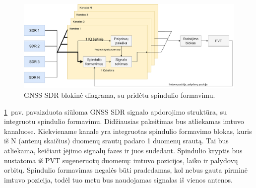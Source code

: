 \documentclass[main.tex]{subfiles}
\begin{document}
\begin{figure}[h]
    \begin{centering}
    \includegraphics[scale=0.5]{drawings/beamformer_sw_implementation}
    \par\end{centering}
    \protect\caption{\label{fig:sw_beamformer_block}GNSS SDR blokinė diagrama, su pridėtu spindulio formavimu.}
\end{figure}

\ref{fig:sw_beamformer_block}~pav. pavaizduota siūloma GNSS SDR signalo apdorojimo
struktūra,
su integruotu spindulio formavimu. Didžiausias pakeitimas bus atliekamas
imtuvo kanaluose. Kiekviename kanale yra integruotas spindulio formavimo
blokas, kuris iš N (antenų skaičius) duomenų srautų padaro 1 duomenų
srautą. Tai bus atliekama, keičiant įėjimo signalų fazes ir juos
sudedant. Spindulio kryptis bus nustatoma iš PVT sugeneruotų duomenų:
imtuvo pozicijos, laiko ir palydovų orbitų.
Spindulio formavimas negalės būti pradedamas, kol nebus gauta pirminė
imtuvo pozicija, todėl tuo metu bus naudojamas signalas iš vienos antenos.
\end{document}
